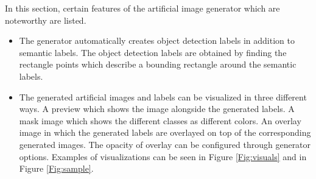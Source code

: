 In this section, certain features of the artificial image generator which are noteworthy are listed.
	\begin{itemize}
		\item The generator automatically creates object detection labels in addition to semantic labels. The object detection labels are obtained by finding the rectangle points which describe a bounding rectangle around the semantic labels.
		\item The generated artificial images and labels can be visualized in three different ways. A preview which shows the image alongside the generated labels. A mask image which shows the different classes as different colors. An overlay image in which the generated labels are overlayed on top of the corresponding generated images. The opacity of overlay can be configured through generator options. Examples of visualizations can be seen in Figure \ref{Fig:visuals} and in Figure \ref{Fig:sample}.
		

\end{itemize}
